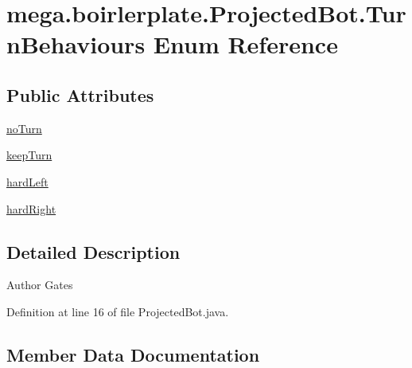 \hypertarget{enummega_1_1boirlerplate_1_1_projected_bot_1_1_turn_behaviours}{}\section{mega.\+boirlerplate.\+Projected\+Bot.\+Turn\+Behaviours Enum Reference}
\label{enummega_1_1boirlerplate_1_1_projected_bot_1_1_turn_behaviours}
\subsection*{Public Attributes}
\begin{DoxyCompactItemize}
\item 
\hyperlink{enummega_1_1boirlerplate_1_1_projected_bot_1_1_turn_behaviours_a97a519403e1c2eabe8899c82ee8d86f2}{no\+Turn}
\item 
\hyperlink{enummega_1_1boirlerplate_1_1_projected_bot_1_1_turn_behaviours_a5afccc1ad3c87d5dbb08b1006194ed68}{keep\+Turn}
\item 
\hyperlink{enummega_1_1boirlerplate_1_1_projected_bot_1_1_turn_behaviours_a6f930fa5a438e571c295b9900cec242f}{hard\+Left}
\item 
\hyperlink{enummega_1_1boirlerplate_1_1_projected_bot_1_1_turn_behaviours_a11246f61c010637ccc020aee00a53be0}{hard\+Right}
\end{DoxyCompactItemize}


\subsection{Detailed Description}
\begin{DoxyAuthor}{Author}
Gates 
\end{DoxyAuthor}


Definition at line 16 of file Projected\+Bot.\+java.



\subsection{Member Data Documentation}
\mbox{\label{enummega_1_1boirlerplate_1_1_projected_bot_1_1_turn_behaviours_a6f930fa5a438e571c295b9900cec242f}} 
